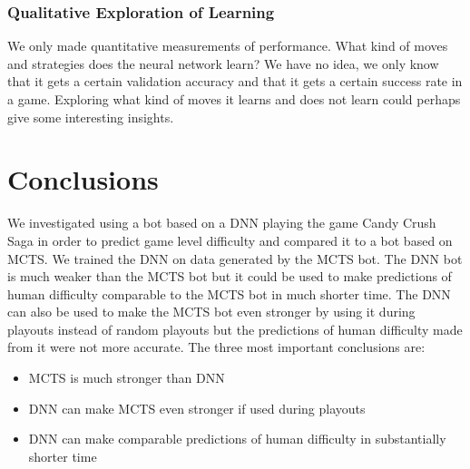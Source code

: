 \documentclass{kththesis}
\begin{document}
\subsubsection{Qualitative Exploration of Learning}
We only made quantitative measurements of performance. What kind of moves and strategies does the neural network learn? We have no idea, we only know that it gets a certain validation accuracy and that it gets a certain success rate in a game. Exploring what kind of moves  it learns and does not learn could perhaps give some interesting insights.

\section{Conclusions}

We investigated using a bot based on a DNN playing the game Candy Crush Saga in order to predict game level difficulty and compared it to a bot based on MCTS. We trained the DNN on data generated by the MCTS bot. The DNN bot is much weaker than the MCTS bot but it could be used to make predictions of human difficulty comparable to the MCTS bot in much shorter time. The DNN can also be used to make the MCTS bot even stronger by using it during playouts instead of random playouts but the predictions of human difficulty made from it were not more accurate. The three most important conclusions are:
\begin{itemize}
\item  MCTS is much stronger than DNN
\item  DNN can make MCTS even stronger if used during playouts
\item DNN can make comparable predictions of human difficulty in substantially shorter time
\end{itemize}




\end{document}
